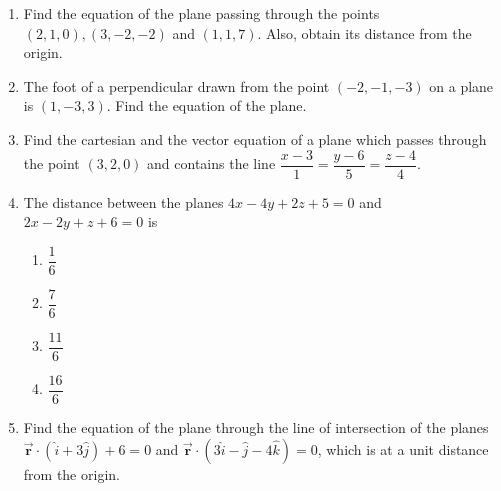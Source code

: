 %
\begin{enumerate}
\item Find the equation of the plane passing through the points $(2,1,0),(3,-2,-2)$ and $(1,1,7)$. Also, obtain its distance from the origin.
\vspace{4mm}
\item The foot of a perpendicular drawn from the point $(-2,-1,-3)$ on a plane is $(1,-3,3)$. Find the equation of the plane.
\vspace{4mm}
\item Find the cartesian and the vector equation of a plane which passes through the point $(3,2,0)$ and contains the line $\dfrac{x-3}{1}=\dfrac{y-6}{5}=\dfrac{z-4}{4}$.
\vspace{4mm}
\item The distance between the planes $4x-4y+2z+5=0$ and $2x-2y+z+6=0$ is
	\begin{enumerate}
		\vspace{2mm}
	\item $\dfrac{1}{6}$
	        \vspace{2mm}
	\item $\dfrac{7}{6}$
		\vspace{2mm}
	\item $\dfrac{11}{6}$
		\vspace{2mm}
	\item $\dfrac{16}{6}$
	\end{enumerate}
		\vspace{4mm}
	\item Find the equation of the plane through the line of intersection of the planes $\overrightarrow{\textbf{r}}\cdot(\hat{i}+3\hat{j})+6=0$ and $\overrightarrow{\textbf{r}}\cdot(3\hat{i}-\hat{j}-4\hat{k})=0$, which is at a  unit distance from the origin.
\end{enumerate}
%

